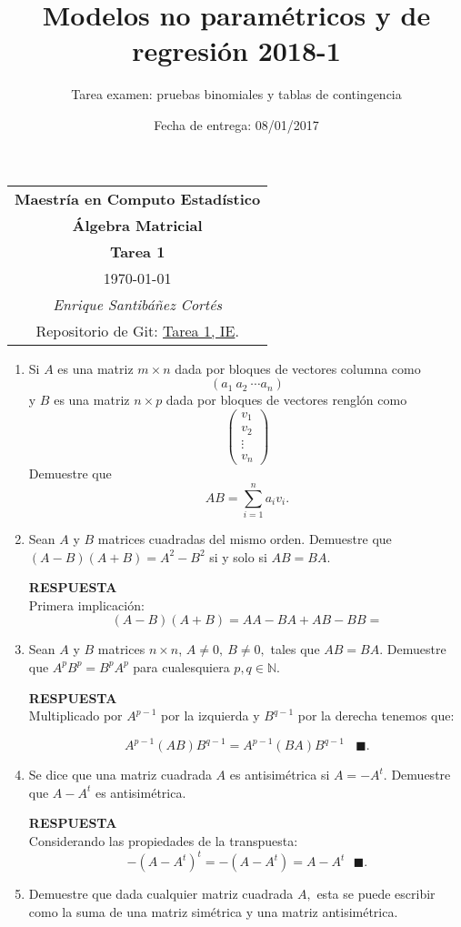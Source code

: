 \documentclass[11pt,letterpaper]{article}
\title{Modelos no paramétricos y de regresión 2018-1}
\author{Tarea examen: pruebas binomiales y tablas de contingencia}
\date{Fecha de entrega: 08/01/2017}
\newcommand{\res}{\textbf{RESPUESTA}\\}
\newcommand{\finf}{\blacksquare.}
\begin{document}
\begin{table}[ht]
\centering
\begin{tabular}{c}
\textbf{Maestría en Computo Estadístico}\\
\textbf{Álgebra Matricial} \\
\textbf{Tarea 1}\\
\today \\
\emph{Enrique Santibáñez Cortés}\\
Repositorio de Git: \href{https://github.com/Enriquesec/Inferencia_Estad-stica/tree/master/Tareas/Tarea_1}{Tarea 1, IE}.
\end{tabular}
\end{table}

\begin{enumerate}
\item Si $A$ es una matriz $m\times n$ dada por bloques de vectores columna como $$ (a_1\ a_2\ \cdots a_n)$$ y $B$ es una matriz $n\times p$ dada por bloques de vectores renglón como
\begin{equation*}
\left(\begin{array}{c}
v_1\\
v_2\\
\vdots \\
v_n
\end{array}
\right)
\end{equation*}
Demuestre que $$AB=\sum_{i=1}^na_iv_i.$$

\item Sean $A$ y $B$ matrices cuadradas del mismo orden. Demuestre que $(A-B)(A+B)=A^2-B^2$ si y solo si $AB=BA.$

\res
Primera implicación:
$$(A-B)(A+B)=AA-BA+AB-BB=$$

\item Sean $A$ y $B$ matrices $n\times n$, $A\neq 0, \ B\neq 0,$ tales que $AB=BA.$ Demuestre que $A^pB^p=B^pA^p$ para cualesquiera $p,q\in \mathbb{N}.$

\res
Multiplicado por $A^{p-1}$ por la izquierda y $B^{q-1}$ por la derecha tenemos que:

$$A^{p-1}(AB)B^{q-1}=A^{p-1}(BA)B^{q-1} \ \ \ \ \finf$$


\item Se dice que una matriz cuadrada $A$ es antisimétrica si $A=-A^t.$ Demuestre que $A-A^t$ es antisimétrica.

\res
Considerando las propiedades de la transpuesta:
$$-(A-A^t)^t=-(A-A^t)=A-A^t\ \ \ \finf$$

\item Demuestre que dada cualquier matriz cuadrada $A,$ esta se puede escribir como la suma de una matriz simétrica y una matriz antisimétrica.


\end{enumerate}
\end{document}
